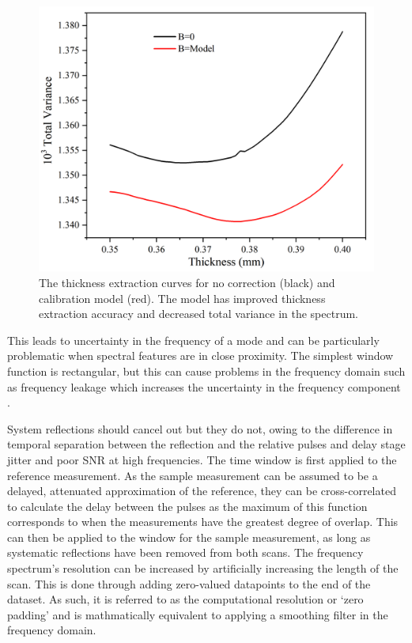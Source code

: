 \begin{figure}
    \centering
    \includegraphics{Figures/Misc/Theory/guoythickness.png}
    \captionsetup{font = footnotesize, justification = centering}
    \caption{The thickness extraction curves for no correction (black) and calibration model (red). The model has improved thickness extraction accuracy and decreased total variance in the spectrum.}
    \label{fig:guoythickness}
\end{figure}

This leads to uncertainty in the frequency of a mode and can be particularly problematic when spectral features are in close proximity. The simplest window function is rectangular, but this can cause problems in the frequency domain such as frequency leakage which increases the uncertainty in the frequency component \cite{Popescu1996}.

System reflections should cancel out but they do not, owing to the difference in temporal separation between the reflection and the relative pulses and delay stage jitter and poor SNR at high frequencies.  The time window is first applied to the reference measurement. As the sample measurement can be assumed to be a delayed, attenuated approximation of the reference, they can be cross-correlated to calculate the delay between the pulses as the maximum of this function corresponds to when the measurements have the greatest degree of overlap. This can then be applied to the window for the sample measurement, as long as systematic reflections have been removed from both scans. The frequency spectrum’s resolution can be increased by artificially increasing the length of the scan. This is done through adding zero-valued datapoints to the end of the dataset. As such, it is referred to as the computational resolution or ‘zero padding’ and is mathmatically equivalent to applying a smoothing filter in the frequency domain.

